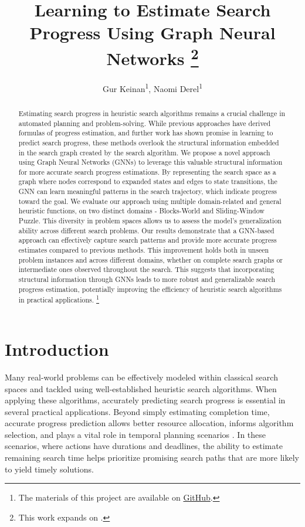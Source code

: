 \documentclass[letterpaper]{article}
\title{Learning to Estimate Search Progress Using Graph Neural Networks \thanks{This work expands on \citet{sudry2022learning}.}}
\author{
    Gur Keinan\textsuperscript{\rm 1},
    Naomi Derel\textsuperscript{\rm 1}
}
\begin{document}
\maketitle

\begin{abstract}
    Estimating search progress in heuristic search algorithms remains a crucial challenge in automated planning and problem-solving. While previous approaches have derived formulas of progress estimation, and further work has shown promise in learning to predict search progress, these methods overlook the structural information embedded in the search graph created by the search algorithm.
    We propose a novel approach using Graph Neural Networks (GNNs) to leverage this valuable structural information for more accurate search progress estimations. By representing the search space as a graph where nodes correspond to expanded states and edges to state transitions, the GNN can learn meaningful patterns in the search trajectory, which indicate progress toward the goal.
    We evaluate our approach using multiple domain-related and general heuristic functions, on two distinct domains - Blocks-World and Sliding-Window Puzzle. This diversity in problem spaces allows us to assess the model's generalization ability across different search problems.
    Our results demonstrate that a GNN-based approach can effectively capture search patterns and provide more accurate progress estimates compared to previous methods. This improvement holds both in unseen problem instances and across different domains, whether on complete search graphs or intermediate ones observed throughout the search.
    This suggests that incorporating structural information through GNNs leads to more robust and generalizable search progress estimation, potentially improving the efficiency of heuristic search algorithms in practical applications.
\footnote{The materials of this project are available on \href{https://github.com/GurKeinan/Artificial-Intelligence-and-Autonomous-Systems}{GitHub}.}
\end{abstract}

\section{Introduction}

Many real-world problems can be effectively modeled within classical search spaces and tackled using well-established heuristic search algorithms. When applying these algorithms, accurately predicting search progress is essential in several practical applications. Beyond simply estimating completion time, accurate progress prediction allows better resource allocation, informs algorithm selection, and plays a vital role in temporal planning scenarios \citep{cashmore2018temporal}. In these scenarios, where actions have durations and deadlines, the ability to estimate remaining search time helps prioritize promising search paths that are more likely to yield timely solutions.
\end{document}
